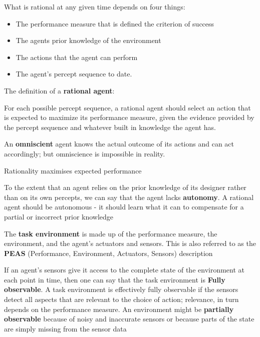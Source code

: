 \documentclass{article}
\begin{document}
What is rational at any given time depends on four things:

\begin{itemize}
    \item The performance measure that is defined the criterion of success
    \item The agents prior knowledge of the environment
    \item The actions that the agent can perform
    \item The agent's percept sequence to date.

\end{itemize}

The definition of a \textbf{rational agent}:

For each possible percept sequence, a rational agent should select an action that is expected to maximize its performance measure, given the evidence provided by the percept sequence and whatever built in knowledge the agent has. \newline

An \textbf{omniscient} agent knows the actual outcome of its actions and can act accordingly; but omniscience is impossible in reality.

Rationality maximises expected performance

To the extent that an agent relies on the prior knowledge of its designer rather than on its own percepts, we can say that the agent lacks \textbf{autonomy}. A rational agent should be autonomous - it should learn what it can to compensate for a partial or incorrect prior knowledge

The \textbf{task environment} is made up of  the performance measure, the environment, and the agent's actuators and sensors. This is also referred to as the \textbf{PEAS} (Performance, Environment, Actuators, Sensors) description \newline

If an agent's sensors give it access to the complete state of the environment at each point in time, then one can say that the task environment is \textbf{Fully observable}. A task environment is effectively fully observable if the sensors detect all aspects that are relevant to the choice of action; relevance, in turn depends on the performance measure. An environment might be \textbf{partially observable} because of noisy and inaccurate sensors or because parts of the state are simply missing from the sensor data \newline
\end{document}
